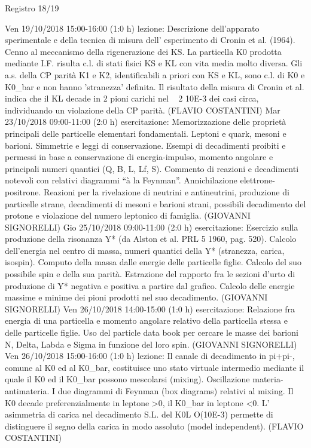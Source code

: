 \begin{frame}{Registro 18/19}
\begin{itemize}
{Ven 19/10/2018 15:00-16:00 (1:0 h) lezione: Descrizione dell'apparato sperimentale e della tecnica di misura dell' esperimento di Cronin et al. (1964). Cenno al meccanismo della rigenerazione dei KS. La particella K0 prodotta mediante I.F. risulta c.l. di stati fisici KS e KL con vita media molto diversa. Gli a.s. della CP parità K1 e K2, identificabili a priori con KS e KL, sono c.l. di K0 e K0_bar e non hanno 'stranezza' definita. Il risultato della misura di Cronin et al. indica che il KL decade in 2 pioni carichi nel ~ 2 10E-3 dei casi circa, individuando un violazione della CP parità. (FLAVIO COSTANTINI)
Mar 23/10/2018 09:00-11:00 (2:0 h) esercitazione: Memorizzazione delle proprietà principali delle particelle elementari fondamentali. Leptoni e quark, mesoni e barioni. Simmetrie e leggi di conservazione. Esempi di decadimenti proibiti e permessi in base a conservazione di energia-impulso, momento angolare e principali numeri quantici (Q, B, L, Lf, S). Commento di reazioni e decadimenti notevoli con relativi diagrammi “à la Feynman”. Annichilazione elettrone-positrone. Reazioni per la rivelazione di neutrini e antineutrini, produzione di particelle strane, decadimenti di mesoni e barioni strani, possibili decadimento del protone e violazione del numero leptonico di famiglia. (GIOVANNI SIGNORELLI)
Gio 25/10/2018 09:00-11:00 (2:0 h) esercitazione: Esercizio sulla produzione della risonanza Y* (da Alston et al. PRL 5 1960, pag. 520). Calcolo dell'energia nel centro di massa, numeri quantici della Y* (stranezza, carica, isospin). Computo della massa dalle energie delle particelle figlie. Calcolo del suo possibile spin e della sua parità. Estrazione del rapporto fra le sezioni d’urto di produzione di Y* negativa e positiva a partire dal grafico. Calcolo delle energie massime e minime dei pioni prodotti nel suo decadimento. (GIOVANNI SIGNORELLI)
Ven 26/10/2018 14:00-15:00 (1:0 h) esercitazione: Relazione fra energia di una particella e momento angolare relativo della particella stessa e delle particelle figlie. Uso del particle data book per cercare le masse dei barioni N, Delta, Labda e Sigma in funzione del loro spin. (GIOVANNI SIGNORELLI)
Ven 26/10/2018 15:00-16:00 (1:0 h) lezione: Il canale di decadimento in pi+pi-, comune al K0 ed al K0_bar, costituisce uno stato virtuale intermedio mediante il quale il K0 ed il K0_bar possono mescolarsi (mixing). Oscillazione materia-antimateria. I due diagrammi di Feynman (box diagrams) relativi al mixing. Il K0 decade preferenzialmente in leptone >0, il K0_bar in leptone <0. L' asimmetria di carica nel decadimento S.L. del K0L O(10E-3) permette di distinguere il segno della carica in modo assoluto (model independent). (FLAVIO COSTANTINI)
}
\end{itemize}
\end{frame}
